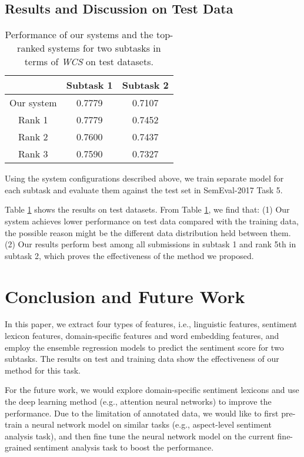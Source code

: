 \documentclass[11pt,a4paper]{article}
\begin{document}
\subsection{Results and Discussion on Test Data}
\begin{table}[!htbp]
\addtolength{\tabcolsep}{7pt}

\begin{tabular}{c|c|c}
\hline
\hline
 & Subtask 1 & Subtask 2 \\
 \hline
 Our system & 0.7779 & 0.7107 \\
 Rank 1 & 0.7779 & 0.7452 \\
 Rank 2 & 0.7600 & 0.7437 \\
 Rank 3 & 0.7590 & 0.7327 \\
 \hline
 \hline
\end{tabular}
\caption{Performance of our systems and the top-ranked systems for two subtasks in terms of \emph{WCS} on test datasets.}
\label{table:result-test}
\end{table}

Using the system configurations described above, we train separate model for each subtask and evaluate them against the test set in SemEval-2017 Task 5.


Table \ref{table:result-test} shows the results on test datasets. From Table \ref{table:result-test}, we find that: (1) Our system achieves lower performance on test data compared with the training data, the possible reason might be the different data distribution held between them.
 (2) Our results perform best among all submissions in subtask 1 and rank 5th in subtask 2, which proves the effectiveness of the method we proposed.




\section{Conclusion and Future Work}

In this paper, we extract four types of features, i.e.,  linguistic features, sentiment lexicon features, domain-specific features and word embedding features, and employ the ensemble regression models to predict the sentiment score for two subtasks. The results on test and training data show the effectiveness of our method for this task.

For the future work, we would explore domain-specific sentiment lexicons and use the deep learning method (e.g., attention neural networks) to improve the performance.
Due to the limitation of annotated data, we would like to first pre-train a neural network model on similar tasks (e.g., aspect-level sentiment analysis task), and then fine tune  the  neural network model on the current  fine-grained sentiment analysis task to boost the performance.
\end{document}
